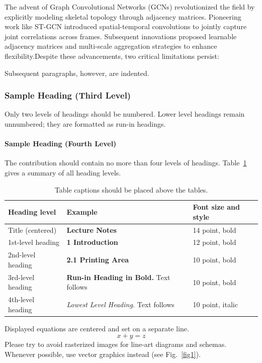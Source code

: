 \documentclass[runningheads]{llncs}
\begin{document}
The advent of Graph Convolutional Networks (GCNs) \cite{ref8} revolutionized the field by 
explicitly modeling skeletal topology through adjacency matrices. Pioneering 
work like ST-GCN \cite{ref7} introduced spatial-temporal convolutions to jointly 
capture joint correlations across frames. Subsequent innovations proposed 
learnable adjacency matrices \cite{ref9,ref10} and multi-scale aggregation 
strategies \cite{ref11} to enhance flexibility.Despite these advancements, 
two critical limitations persist:

Subsequent paragraphs, however, are indented.

\subsubsection{Sample Heading (Third Level)} Only two levels of
headings should be numbered. Lower level headings remain unnumbered;
they are formatted as run-in headings.

\paragraph{Sample Heading (Fourth Level)}
The contribution should contain no more than four levels of
headings. Table~\ref{tab1} gives a summary of all heading levels.

\begin{table}
\caption{Table captions should be placed above the
tables.}\label{tab1}
\begin{tabular}{|l|l|l|}
\hline
Heading level &  Example & Font size and style\\
\hline
Title (centered) &  {\Large\bfseries Lecture Notes} & 14 point, bold\\
1st-level heading &  {\large\bfseries 1 Introduction} & 12 point, bold\\
2nd-level heading & {\bfseries 2.1 Printing Area} & 10 point, bold\\
3rd-level heading & {\bfseries Run-in Heading in Bold.} Text follows & 10 point, bold\\
4th-level heading & {\itshape Lowest Level Heading.} Text follows & 10 point, italic\\
\hline
\end{tabular}
\end{table}


\noindent Displayed equations are centered and set on a separate
line.
\begin{equation}
x + y = z
\end{equation}
Please try to avoid rasterized images for line-art diagrams and
schemas. Whenever possible, use vector graphics instead (see
Fig.~\ref{fig1}).
\end{document}
